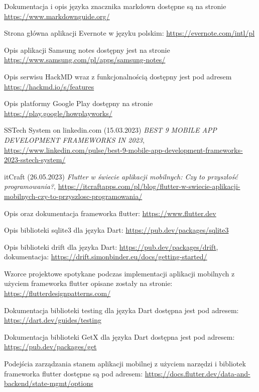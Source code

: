 \documentclass[shortabstract]{iithesis}
\begin{document}
\begin{thebibliography}{1}
Dokumentacja i opis języka znacznika markdown dostępne są na stronie \url{https://www.markdownguide.org/}

Strona główna aplikacji Evernote w języku polskim: \url{https://evernote.com/intl/pl}

Opis aplikacji Samsung notes dostępny jest na stronie \url{https://www.samsung.com/pl/apps/samsung-notes/}

Opis serwisu HackMD wraz z funkcjonalnością dostępny jest pod adresem \url{https://hackmd.io/s/features}

Opis platformy Google Play dostępny na stronie \url{https://play.google/howplayworks/}

SSTech System on linkedin.com (15.03.2023) \emph{BEST 9 MOBILE APP DEVELOPMENT FRAMEWORKS IN 2023}, \url{https://www.linkedin.com/pulse/best-9-mobile-app-development-frameworks-2023-sstech-system/}

itCraft (26.05.2023) \emph{Flutter w świecie aplikacji mobilnych: Czy to przyszłość programowania?}, \url{https://itcraftapps.com/pl/blog/flutter-w-swiecie-aplikacji-mobilnych-czy-to-przyszlosc-programowania/}

Opis oraz dokumentacja frameworka flutter: \url{https://www.flutter.dev}

Opis biblioteki sqlite3 dla języka Dart: \url{https://pub.dev/packages/sqlite3}

Opis biblioteki drift dla języka Dart: \url{https://pub.dev/packages/drift}, dokumentacja: \url{https://drift.simonbinder.eu/docs/getting-started/}

Wzorce projektowe spotykane podczas implementacji aplikacji mobilnych z użyciem frameworka flutter opisane zostały na stronie: \url{https://flutterdesignpatterns.com/}

Dokumentacja biblioteki testing dla języka Dart dostępna jest pod adresem: \url{https://dart.dev/guides/testing}

Dokumentacja biblioteki GetX dla języka Dart dostępna jest pod adresem: \url{https://pub.dev/packages/get}

Podejścia zarządzania stanem aplikacji mobilnej z użyciem narzędzi i bibliotek frameworka flutter dostępne są pod adresem: \url{https://docs.flutter.dev/data-and-backend/state-mgmt/options}

\end{thebibliography}
\end{document}

